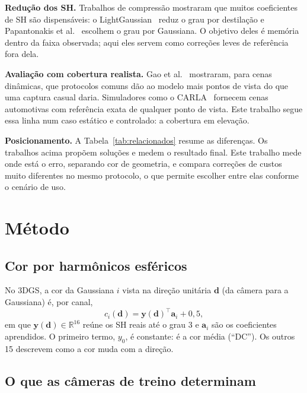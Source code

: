 \documentclass[conference]{IEEEtran}
\begin{document}
\textbf{Redução dos SH.} Trabalhos de compressão mostraram que muitos coeficientes de SH são dispensáveis: o LightGaussian~\cite{fan2024lightgaussian} reduz o grau por destilação e Papantonakis et al.~\cite{papantonakis2024reducing} escolhem o grau por Gaussiana. O objetivo deles é memória dentro da faixa observada; aqui eles servem como correções leves de referência fora dela.

\textbf{Avaliação com cobertura realista.} Gao et al.~\cite{gao2022dycheck} mostraram, para cenas dinâmicas, que protocolos comuns dão ao modelo mais pontos de vista do que uma captura casual daria. Simuladores como o CARLA~\cite{dosovitskiy2017carla} fornecem cenas automotivas com referência exata de qualquer ponto de vista. Este trabalho segue essa linha num caso estático e controlado: a cobertura em elevação.

\textbf{Posicionamento.} A Tabela~\ref{tab:relacionados} resume as diferenças. Os trabalhos acima propõem soluções e medem o resultado final. Este trabalho mede onde está o erro, separando cor de geometria, e compara correções de custos muito diferentes no mesmo protocolo, o que permite escolher entre elas conforme o cenário de uso.



\section{Método}\label{sec:metodo}

\subsection{Cor por harmônicos esféricos}

No 3DGS, a cor da Gaussiana $i$ vista na direção unitária $\mathbf{d}$ (da câmera para a Gaussiana) é, por canal,
\begin{equation}
c_i(\mathbf{d}) = \mathbf{y}(\mathbf{d})^\top \mathbf{a}_i + 0{,}5,
\end{equation}
em que $\mathbf{y}(\mathbf{d}) \in \mathbb{R}^{16}$ reúne os SH reais até o grau 3 e $\mathbf{a}_i$ são os coeficientes aprendidos. O primeiro termo, $y_0$, é constante: é a cor média (``DC''). Os outros 15 descrevem como a cor muda com a direção.

\subsection{O que as câmeras de treino determinam}
\end{document}
